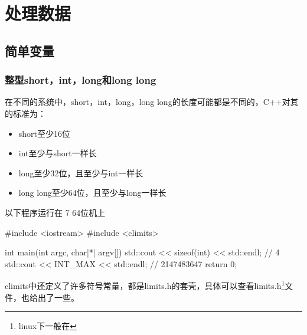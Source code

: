 
\chapter{处理数据}

\section{简单变量}

\subsection{整型short，int，long和long long}

在不同的系统中，short，int，long，long long的长度可能都是不同的，C++对其的标准为：

\begin{itemize}
\item short至少16位
\item int至少与short一样长
\item long至少32位，且至少与int一样长
\item long long至少64位，且至少与long一样长
\end{itemize}

以下程序运行在 7 64位机上

\begin{cpp}
#include <iostream>
#include <climits>

int main(int argc, char|*| argv[]) {
    std::cout << sizeof(int) << std::endl; // 4
    std::cout << INT_MAX << std::endl;     // 2147483647
    return 0;
}
\end{cpp}

climits中还定义了许多符号常量，都是limits.h的套壳，具体可以查看limits.h\footnote{linux下一般在}文件，也给出了一些。

